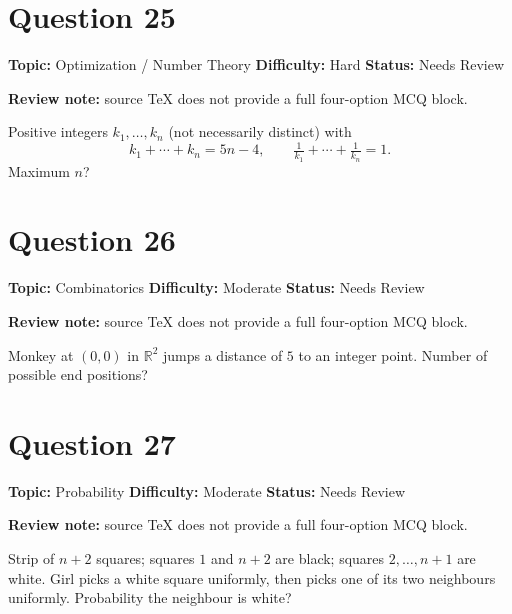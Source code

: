 \documentclass[11pt]{article}
\begin{document}
\section*{Question 25}


\noindent\textbf{Topic:} Optimization / Number Theory \quad \textbf{Difficulty:} Hard \quad \textbf{Status:} Needs Review

\par\noindent\textcolor{StatAmber}{\textbf{Review note:} source TeX does not provide a full four-option MCQ block.}


Positive integers $k_1,\dots,k_n$ (not necessarily distinct) with
\[
k_1+\cdots+k_n=5n-4,\qquad \tfrac{1}{k_1}+\cdots+\tfrac{1}{k_n}=1.
\]
Maximum $n$?

\newpage

\section*{Question 26}


\noindent\textbf{Topic:} Combinatorics \quad \textbf{Difficulty:} Moderate \quad \textbf{Status:} Needs Review

\par\noindent\textcolor{StatAmber}{\textbf{Review note:} source TeX does not provide a full four-option MCQ block.}


Monkey at $(0,0)$ in $\mathbb R^2$ jumps a distance of $5$ to an integer point. Number of possible end positions?

\newpage

\section*{Question 27}


\noindent\textbf{Topic:} Probability \quad \textbf{Difficulty:} Moderate \quad \textbf{Status:} Needs Review

\par\noindent\textcolor{StatAmber}{\textbf{Review note:} source TeX does not provide a full four-option MCQ block.}


Strip of $n+2$ squares; squares $1$ and $n+2$ are black; squares $2,\dots,n+1$ are white. Girl picks a white square uniformly, then picks one of its two neighbours uniformly. Probability the neighbour is white?
\end{document}
